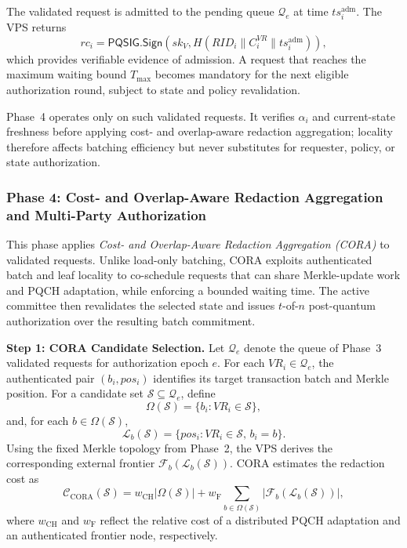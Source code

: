 \documentclass[lettersize,journal]{IEEEtran}
\begin{document}
The validated request is admitted to the pending queue
$\mathcal{Q}_e$ at time $ts_i^{\mathrm{adm}}$. The VPS returns
\begin{equation}
rc_i=
\mathsf{PQSIG.Sign}
\left(
sk_V,
H(RID_i\parallel C_i^{VR}\parallel
ts_i^{\mathrm{adm}})
\right),
\end{equation}
which provides verifiable evidence of admission. A request that reaches
the maximum waiting bound $T_{\max}$ becomes mandatory for the next
eligible authorization round, subject to state and policy revalidation.

Phase~4 operates only on such validated requests. It verifies
$\alpha_i$ and current-state freshness before applying
cost- and overlap-aware redaction aggregation; locality therefore
affects batching efficiency but never substitutes for requester,
policy, or state authorization.
    
    
  \subsubsection*{\textbf{Phase 4: Cost- and Overlap-Aware Redaction
Aggregation and Multi-Party Authorization}}

This phase applies \emph{Cost- and Overlap-Aware Redaction Aggregation
(CORA)} to validated requests. Unlike load-only batching, CORA exploits
authenticated batch and leaf locality to co-schedule requests that can
share Merkle-update work and PQCH adaptation, while enforcing a bounded
waiting time. The active committee then revalidates the selected state
and issues $t$-of-$n$ post-quantum authorization over the resulting
batch commitment.

\medskip
\noindent\textbf{Step 1: CORA Candidate Selection.}
Let $\mathcal{Q}_e$ denote the queue of Phase~3 validated requests for
authorization epoch $e$. For each $VR_i\in\mathcal{Q}_e$, the authenticated
pair $(b_i,pos_i)$ identifies its target transaction batch and Merkle
position. For a candidate set $\mathcal{S}\subseteq\mathcal{Q}_e$, define
\begin{equation}
\Omega(\mathcal{S})
=
\{b_i:VR_i\in\mathcal{S}\},
\end{equation}
and, for each $b\in\Omega(\mathcal{S})$,
\begin{equation}
\mathcal{L}_b(\mathcal{S})
=
\{pos_i:VR_i\in\mathcal{S},\,b_i=b\}.
\end{equation}
Using the fixed Merkle topology from Phase~2, the VPS derives the
corresponding external frontier
$\mathcal{F}_b(\mathcal{L}_b(\mathcal{S}))$. CORA estimates the
redaction cost as
\begin{equation}
\mathcal{C}_{\mathrm{CORA}}(\mathcal{S})
=
w_{\mathrm{CH}}|\Omega(\mathcal{S})|
+
w_{\mathrm{F}}
\sum_{b\in\Omega(\mathcal{S})}
|\mathcal{F}_b(\mathcal{L}_b(\mathcal{S}))|,
\end{equation}
where $w_{\mathrm{CH}}$ and $w_{\mathrm{F}}$ reflect the relative cost
of a distributed PQCH adaptation and an authenticated frontier node,
respectively.
\end{document}
